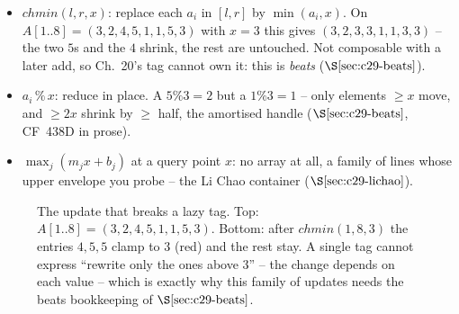 \begin{itemize}[nosep, leftmargin=1.6em]
  \item \(\mathit{chmin}(l,r,x)\): replace each \(a_i\) in \([l,r]\) by
        \(\min(a_i,x)\).  On \(A[1..8]=(3,2,4,5,1,1,5,3)\) with \(x=3\) this
        gives \((3,2,3,3,1,1,3,3)\) -- the two \(5\)s and the \(4\) shrink, the
        rest are untouched.  Not composable with a later add, so Ch.~20's tag
        cannot own it: this is \emph{beats} (\(\secref{c29-beats}\)).
  \item \(a_i \mathbin{\%} x\): reduce in place.  A \(5\%3=2\) but a \(1\%3=1\)
        -- only elements \(\ge x\) move, and \(\ge 2x\) shrink by \(\ge\) half,
        the amortised handle (\(\secref{c29-beats}\), CF~438D in prose).
  \item \(\max_j (m_j x + b_j)\) at a query point \(x\): no array at all, a
        family of lines whose upper envelope you probe -- the Li Chao container
        (\(\secref{c29-lichao}\)).
\end{itemize}

\begin{figure}[H]
\centering
{}
\caption{The update that breaks a lazy tag.  Top: \(A[1..8]=(3,2,4,5,1,1,5,3)\).
Bottom: after \(\mathit{chmin}(1,8,3)\) the entries \(4,5,5\) clamp to \(3\)
(red) and the rest stay.  A single tag cannot express ``rewrite only the ones
above \(3\)'' -- the change depends on each value -- which is exactly why this
family of updates needs the beats bookkeeping of \(\secref{c29-beats}\).}
\label{fig:c29-gallery}
\end{figure}

